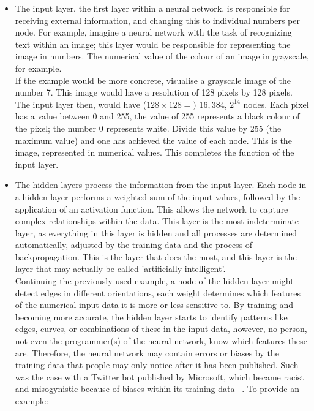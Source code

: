 \documentclass[a4paper,12pt]{report}
\begin{document}
\begin{itemize}
    \item{The input layer, the first layer within a neural network, is responsible for receiving external information, and changing this to individual numbers per node. For example, imagine a neural network with the task of recognizing text within an image; this layer would be responsible for representing the image in numbers. The numerical value of the colour of an image in grayscale, for example.\\
    If the example would be more concrete, visualise a grayscale image of the number 7. This image would have a resolution of 128 pixels by 128 pixels. The input layer then, would have (\(128\times128 =)\) \hspace{.25mm} \(16,384\), \(2^{14}\) nodes. Each pixel has a value between 0 and 255, the value of 255 represents a black colour of the pixel; the number 0 represents white. Divide this value by 255 (the maximum value) and one has achieved the value of each node. This is the image, represented in numerical values. This completes the function of the input layer.}
    \item{The hidden layers process the information from the input layer. Each node in a hidden layer performs a weighted sum of the input values, followed by the application of an activation function. This allows the network to capture complex relationships within the data. This layer is the most indeterminate layer, as everything in this layer is hidden and all processes are determined automatically, adjusted by the training data and the process of backpropagation. This is the layer that does the most, and this layer is the layer that may actually be called 'artificially intelligent'.\\
    Continuing the previously used example, a node of the hidden layer might detect edges in different orientations, each weight determines which features of the numerical input data it is more or less sensitive to. By training and becoming more accurate, the hidden layer starts to identify patterns like edges, curves, or combinations of these in the input data, however, no person, not even the programmer(s) of the neural network, know which features these are. Therefore, the neural network may contain errors or biases by the training data that people may only notice after it has been published. Such was the case with a Twitter bot published by Microsoft, which became racist and misogynistic because of biases within its training data ~\cite{nazibot16}. To provide an example:\\
}
\end{itemize}
\end{document}
